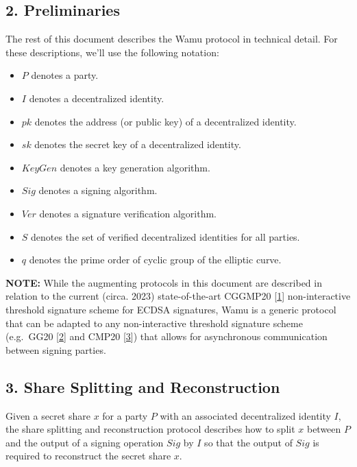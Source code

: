 \documentclass[
]{article}
\providecommand{\tightlist}{%
  \setlength{\itemsep}{0pt}\setlength{\parskip}{0pt}}
\begin{document}
\hypertarget{preliminaries}{%
\subsection{2. Preliminaries}\label{preliminaries}}

The rest of this document describes the Wamu protocol in technical
detail. For these descriptions, we'll use the following notation:

\begin{itemize}
\tightlist
\item
  \(P\) denotes a party.
\item
  \(I\) denotes a decentralized identity.
\item
  \(pk\) denotes the address (or public key) of a decentralized
  identity.
\item
  \(sk\) denotes the secret key of a decentralized identity.
\item
  \(KeyGen\) denotes a key generation algorithm.
\item
  \(Sig\) denotes a signing algorithm.
\item
  \(Ver\) denotes a signature verification algorithm.
\item
  \(S\) denotes the set of verified decentralized identities for all
  parties.
\item
  \(q\) denotes the prime order of cyclic group of the elliptic curve.
\end{itemize}

\textbf{NOTE:} While the augmenting protocols in this document are
described in relation to the current (circa. 2023) state-of-the-art
CGGMP20 {[}\protect\hyperlink{ref-cggmp20}{1}{]} non-interactive
threshold signature scheme for ECDSA signatures, Wamu is a generic
protocol that can be adapted to any non-interactive threshold signature
scheme (e.g.~GG20 {[}\protect\hyperlink{ref-gg20}{2}{]} and CMP20
{[}\protect\hyperlink{ref-cmp20}{3}{]}) that allows for asynchronous
communication between signing parties.

\hypertarget{share-splitting-and-reconstruction}{%
\subsection{3. Share Splitting and
Reconstruction}\label{share-splitting-and-reconstruction}}

Given a secret share \(x\) for a party \(P\) with an associated
decentralized identity \(I\), the share splitting and reconstruction
protocol describes how to split \(x\) between \(P\) and the output of a
signing operation \(Sig\) by \(I\) so that the output of \(Sig\) is
required to reconstruct the secret share \(x\).
\end{document}
